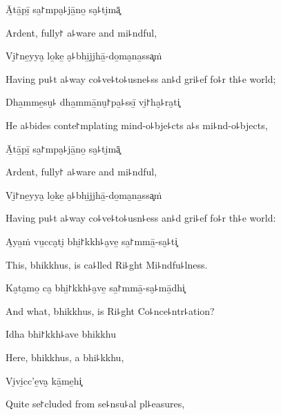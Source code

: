 Ā̱tā̱pī̱ sa̱꜓mpa̮꜕jā̱no̱ sa̮꜕ti̮mā͓

\begin{english}
  Ardent, fully꜓ a꜕ware and mi꜕ndful,
\end{english}

Vi̮꜓ne̱yya̮ lo̱ke̱ a̮꜕bhi̱jjhā̱-do̱ma̮na̱ssa͓ṁ

\begin{english}
  Having pu꜕t a꜕way co꜕ve꜕to꜕usne꜕ss an꜕d gri꜕ef fo꜕r th꜕e world;
\end{english}

Dha̱mme̱su̮꜕ dha̱mmā̱nu̮꜓pa̱꜕ssī̱ vi̮꜓ha̮꜕ra̮ti͓

\begin{english}
  He a꜕bides conte꜓mplating mind-o꜕bje꜕cts a꜕s mi꜕nd-o꜕bjects,
\end{english}

Ā̱tā̱pī̱ sa̱꜓mpa̮꜕jā̱no̱ sa̮꜕ti̮mā͓

\begin{english}
  Ardent, fully꜓ a꜕ware and mi꜕ndful,
\end{english}

Vi̮꜓ne̱yya̮ lo̱ke̱ a̮꜕bhi̱jjhā̱-do̱ma̮na̱ssa͓ṁ

\begin{english}
  Having pu꜕t a꜕way co꜕ve꜕to꜕usn꜕ess an꜕d gri꜕ef fo꜕r th꜕e world:
\end{english}

A̮ya̱ṁ vu̱cca̮ti̮ bhi̱꜓kkh꜕a̮ve̱ sa̱꜓mmā̱-sa̮꜕ti͓

\begin{english}
  This, bhikkhus, is ca꜕lled Ri꜕ght Mi꜕ndfu꜕lness.
\end{english}

\ifaivedition
\clearpage
\fi

Ka̮ta̮mo̱ ca̮ bhi̱꜓kkh꜕a̮ve̱ sa̱꜓mmā̱-sa̮꜕mā̱dhi͓

\begin{english}
  And what, bhikkhus, is Ri꜕ght Co꜕nce꜕ntr꜕ation?
\end{english}

Idha bhi꜓kkh꜕ave bhikkhu

\begin{english}
  Here, bhikkhus, a bhi꜕kkhu,
\end{english}

Vi̮vi̱cc'e̱va̮ kā̱me̱hi͓

\begin{english}
  Quite se꜓cluded from se꜕nsu꜕al pl꜕easures,
\end{english}

